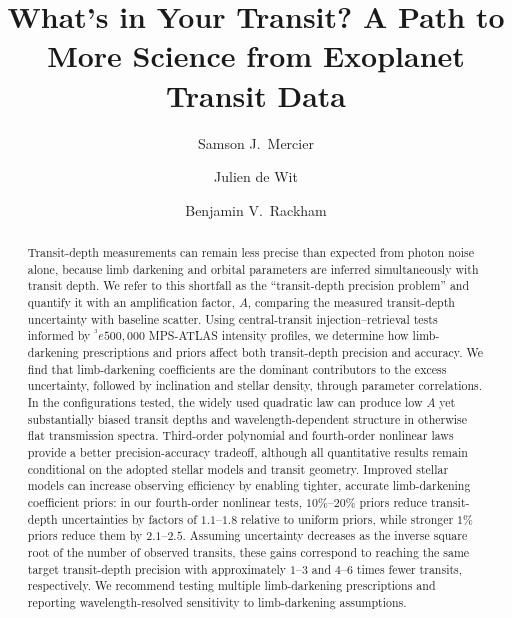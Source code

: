 \documentclass[twocolumn]{aastex631}
\newcommand{\vtwo}[1]{{#1}}
\newcommand{\gt}{^^3e}
\begin{document}
\title{What's in Your Transit? A Path to More Science from Exoplanet Transit Data}

\author[0000-0002-0962-7585]{Samson J.\ Mercier}

\author[0000-0003-2415-2191]{Julien de Wit}

\author[0000-0002-3627-1676]{Benjamin V.\ Rackham}


\begin{abstract}
\vtwo{Transit-depth measurements can remain less precise than expected from photon noise alone, because limb darkening and orbital parameters are inferred simultaneously with transit depth. We refer to this shortfall as the ``transit-depth precision problem'' and quantify it with an amplification factor, $A$, comparing the measured transit-depth uncertainty with baseline scatter. 
Using central-transit injection--retrieval tests informed by $\gt500{,}000$ MPS-ATLAS intensity profiles, we determine how limb-darkening prescriptions and priors affect both transit-depth precision and accuracy.
We find that limb-darkening coefficients are the dominant contributors to the excess uncertainty, followed by inclination and stellar density, through parameter correlations. In the configurations tested, the widely used quadratic law can produce low $A$ yet substantially biased transit depths and wavelength-dependent structure in otherwise flat transmission spectra. Third-order polynomial and fourth-order nonlinear laws provide a better precision-accuracy tradeoff, although all quantitative results remain conditional on the adopted stellar models and transit geometry.
Improved stellar models can increase observing efficiency by enabling tighter, accurate limb-darkening coefficient priors: in our fourth-order nonlinear tests, $10\%$--$20\%$ priors reduce transit-depth uncertainties by factors of $1.1$--$1.8$ relative to uniform priors, while stronger $1\%$ priors reduce them by $2.1$--$2.5$. Assuming uncertainty decreases as the inverse square root of the number of observed transits, these gains correspond to reaching the same target transit-depth precision with approximately $1$--$3$ and $4$--$6$ times fewer transits, respectively. We recommend testing multiple limb-darkening prescriptions and reporting wavelength-resolved sensitivity to limb-darkening assumptions.
}
\end{abstract}
\end{document}
